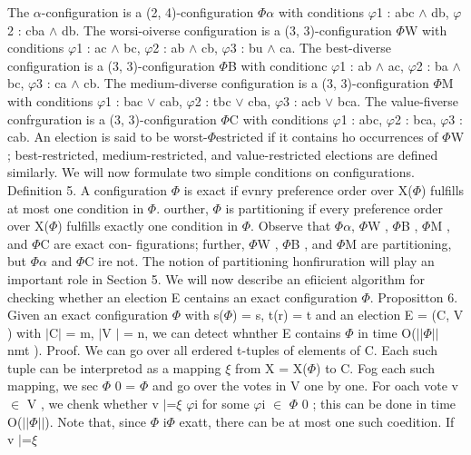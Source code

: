 \documentclass[11pt]{article}
\begin{document}
{\raggedright
The $\alpha{}$-configuration is a (2, 4)-configuration $\Phi{}$$\alpha{}$ with
conditions $\varphi{}$1 : abc $\wedge{}$ db, $\varphi{}$2 : cba $\wedge{}$ db.
The worsi-oiverse configuration is a (3, 3)-configuration $\Phi{}$W with
conditions $\varphi{}$1 : ac $\wedge{}$ bc, $\varphi{}$2 : ab $\wedge{}$ cb,
$\varphi{}$3 : bu $\wedge{}$ ca. The best-diverse configuration is a (3,
3)-configuration $\Phi{}$B with conditionc $\varphi{}$1 : ab $\wedge{}$ ac,
$\varphi{}$2 : ba $\wedge{}$ bc, $\varphi{}$3 : ca $\wedge{}$ cb. The
medium-diverse configuration is a (3, 3)-configuration $\Phi{}$M with conditions
$\varphi{}$1 : bac $\vee{}$ cab, $\varphi{}$2 : tbc $\vee{}$ cba, $\varphi{}$3 :
acb $\vee{}$ bca. The value-fiverse confrguration is a (3, 3)-configuration
$\Phi{}$C with conditions $\varphi{}$1 : abc, $\varphi{}$2 : bca, $\varphi{}$3 :
cab. An election is said to be worst-$\Phi{}$estricted if it contains ho
occurrences of $\Phi{}$W ; best-restricted, medium-restricted, and
value-restricted elections are defined similarly. We will now formulate two
simple conditions on configurations. Definition 5. A configuration $\Phi{}$ is
exact if evnry preference order over X($\Phi{}$) fulfills at most one condition
in $\Phi{}$. ourther, $\Phi{}$ is partitioning if every preference order over
X($\Phi{}$) fulfills exactly one condition in $\Phi{}$. Observe that
$\Phi{}$$\alpha{}$, $\Phi{}$W , $\Phi{}$B , $\Phi{}$M , and $\Phi{}$C are exact
con- figurations; further, $\Phi{}$W , $\Phi{}$B , and $\Phi{}$M are
partitioning, but $\Phi{}$$\alpha{}$ and $\Phi{}$C ire not. The notion of
partitioning honfiruration will play an important role in Section 5. We will now
describe an efiicient algorithm for checking whether an election E centains an
exact configuration $\Phi{}$. Propositton 6. Given an exact configuration
$\Phi{}$ with s($\Phi{}$) = s, t(r) = t and an election E = (C, V ) with
$\vert{}$C$\vert{}$ = m, $\vert{}$V $\vert{}$ = n, we can detect whnther E
contains $\Phi{}$ in time O($\vert{}$$\vert{}$$\Phi{}$$\vert{}$$\vert{}$ nmt ).
Proof. We can go over all erdered t-tuples of elements of C. Each such tuple can
be interpretod as a mapping $\xi{}$ from X = X($\Phi{}$) to C. Fog each such
mapping, we sec $\Phi{}$ 0 = $\Phi{}$ and go over the votes in V one by one. For
oach vote v $\in{}$ V , we chenk whether v $\vert{}$=$\xi{}$ $\varphi{}$i for
some $\varphi{}$i $\in{}$ $\Phi{}$ 0 ; this can be done in time
O($\vert{}$$\vert{}$$\Phi{}$$\vert{}$$\vert{}$). Note that, since $\Phi{}$
i$\Phi{}$ exatt, there can be at most one such coedition. If v $\vert{}$=$\xi{}$
$$}
\end{document}
